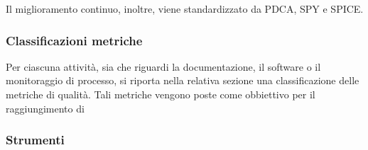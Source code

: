 
	Il miglioramento continuo, inoltre, viene standardizzato da PDCA, SPY e SPICE.  %


	\subsubsection{Classificazioni metriche} %
	
	Per ciascuna attività, sia che riguardi la documentazione, il software o il monitoraggio di processo, si riporta nella relativa sezione una classificazione delle metriche di qualità. Tali metriche vengono poste come obbiettivo per il raggiungimento di 

	\subsubsection{Strumenti} %
	
